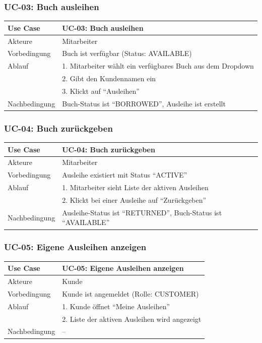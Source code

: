 \documentclass[a4paper,12pt,twoside]{report}
\begin{document}
\subsubsection{UC-03: Buch ausleihen}
\begin{table}[H]
\begin{tabularx}{\textwidth}{l X}
\toprule
\textbf{Use Case} & UC-03: Buch ausleihen \\
\midrule
Akteure & Mitarbeiter \\
Vorbedingung & Buch ist verfügbar (Status: AVAILABLE) \\
Ablauf & 1. Mitarbeiter wählt ein verfügbares Buch aus dem Dropdown\\
& 2. Gibt den Kundennamen ein\\
& 3. Klickt auf ``Ausleihen'' \\
Nachbedingung & Buch-Status ist ``BORROWED'', Ausleihe ist erstellt \\
\bottomrule
\end{tabularx}
\end{table}

\subsubsection{UC-04: Buch zurückgeben}
\begin{table}[H]
\begin{tabularx}{\textwidth}{l X}
\toprule
\textbf{Use Case} & UC-04: Buch zurückgeben \\
\midrule
Akteure & Mitarbeiter \\
Vorbedingung & Ausleihe existiert mit Status ``ACTIVE'' \\
Ablauf & 1. Mitarbeiter sieht Liste der aktiven Ausleihen\\
& 2. Klickt bei einer Ausleihe auf ``Zurückgeben'' \\
Nachbedingung & Ausleihe-Status ist ``RETURNED'', Buch-Status ist ``AVAILABLE'' \\
\bottomrule
\end{tabularx}
\end{table}

\subsubsection{UC-05: Eigene Ausleihen anzeigen}
\begin{table}[H]
\begin{tabularx}{\textwidth}{l X}
\toprule
\textbf{Use Case} & UC-05: Eigene Ausleihen anzeigen \\
\midrule
Akteure & Kunde \\
Vorbedingung & Kunde ist angemeldet (Rolle: CUSTOMER) \\
Ablauf & 1. Kunde öffnet ``Meine Ausleihen''\\
& 2. Liste der aktiven Ausleihen wird angezeigt \\
Nachbedingung & -- \\
\bottomrule
\end{tabularx}
\end{table}
\end{document}
